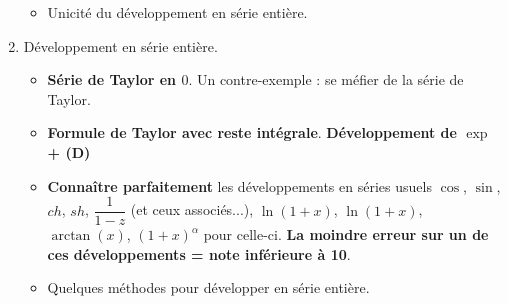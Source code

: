 \documentclass[twoside,a4paper,french,10pt]{VcCours}
\begin{document}
\begin{enumerate}
\begin{itemize}
\item Unicité du développement en série entière.
\end{itemize}
\item Développement en série entière.
\begin{itemize}
\item \textbf{Série de Taylor en $0$}. Un contre-exemple : se méfier de la série de Taylor. 
\item \textbf{Formule de Taylor avec reste intégrale}. \textbf{Développement de $\exp$ + (D)}
\item \textbf{Connaître parfaitement} les développements en séries usuels 
$\cos$, $\sin$, $ch$, $sh$, $\dfrac{1}{1-z}$ (et ceux associés...), 
$\ln(1+x)$, $\ln(1+x)$, $\arctan(x)$, $(1+x)^{\alpha}$%
pour celle-ci. \textbf{La moindre erreur sur un de ces développements 
= note inférieure à 10}.
\item Quelques méthodes pour développer en série entière.
\end{itemize}
\end{enumerate}

\vspace*{-1em}
\end{document}
